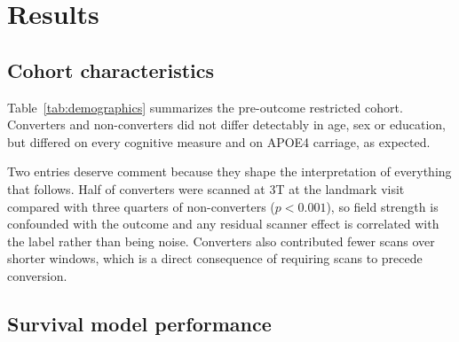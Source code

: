 \documentclass[blue]{ludusofficial}  %
\begin{document}
\section{Results}

\subsection{Cohort characteristics}


Table~\ref{tab:demographics} summarizes the pre-outcome restricted cohort. Converters and non-converters did not differ detectably in age, sex or education, but differed on every cognitive measure and on APOE4 carriage, as expected.

Two entries deserve comment because they shape the interpretation of everything that follows. Half of converters were scanned at 3T at the landmark visit compared with three quarters of non-converters ($p<0.001$), so field strength is confounded with the outcome and any residual scanner effect is correlated with the label rather than being noise. Converters also contributed fewer scans over shorter windows, which is a direct consequence of requiring scans to precede conversion.

\subsection{Survival model performance}
\end{document}
